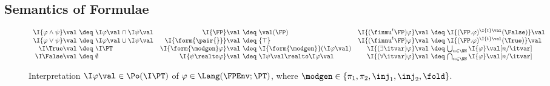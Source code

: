 \subsection{Semantics of Formulae}
\label{sec:sem:log}

\begin{figure}[t!]
\centering
\(
\begin{array}{r @{~}c@{~} l r @{~}c@{~} l r @{~}c@{~} l}
%
  \I{\varphi \land \psi}\val
& \deq
& \I\varphi\val \cap \I\psi\val
%
& \I{\FP}\val
& \deq
& \val(\FP)
%
& \I{(\finmu^t \FP)\varphi}\val
& \deq
& \I{(\FP.\varphi)^{\I{t}\val}(\False)}\val
\\
%
  \I{\varphi \lor \psi}\val
& \deq
& \I\varphi\val \cup \I\psi\val
%
& \I{\form{\pair{}}}\val
& \deq
& \{\top\}
%
& \I{(\finnu^t \FP)\varphi}\val
& \deq
& \I{(\FP.\varphi)^{\I{t}\val}(\True)}\val
\\
%
  \I\True\val
& \deq
& \I\PT
%
& \I{\form{\modgen}\varphi}\val
& \deq
& \I{\form{\modgen}}(\I\varphi\val)
%
& \I{(\exists \itvar)\varphi}\val
& \deq
& \bigcup_{n \in \NN} \I{\varphi}\val[n / \itvar]
\\
%
  \I\False\val
& \deq
& \emptyset
%
& \I{\psi \realto \varphi}\val
& \deq
& \I\psi\val \realto \I\varphi\val
%
& \I{(\forall \itvar)\varphi}\val
& \deq
& \bigcap_{n \in \NN} \I{\varphi}\val[n / \itvar]
%
\end{array}
\)
\caption{Interpretation $\I\varphi\val \in \Po(\I\PT)$
of $\varphi \in \Lang(\FPEnv;\PT)$,
where $\modgen \in \{\pi_1,\pi_2,\inj_1,\inj_2,\fold\}$.%
\label{fig:sem:form}}
\end{figure}

